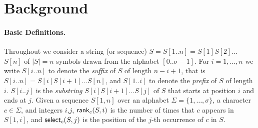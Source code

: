 \section{Background}
\label{sec-background}


\paragraph{Basic Definitions.}
Throughout we consider a string (or sequence) $S = S[1..n] = S[1]S[2]\ldots$ $S[n]$ of $|S| = n$ 
symbols drawn from the alphabet $[0..\sigma-1]$.
For $i=1,\ldots,n$ we
write $S[i..n]$ to denote the {\em suffix} of $S$ of length $n-i+1$,
that is $S[i..n] = S[i]S[i+1]\ldots S[n]$, and  
$S[1..i]$ to denote the {\em prefix} of $S$ of length $i$.
$S[i..j]$ is the {\em substring} $S[i]S[i+1]\ldots S[j]$ of $S$
that starts at position $i$ and ends at $j$. 
Given a sequence $S[1,n]$ over an alphabet $\Sigma =
\{1,\ldots,\sigma\}$, a character $c \in \Sigma $, and integers
$i$,$j$, $\textsf{rank}_c(S,i)$ is the number of times that $c$ appears in
$S[1,i]$, and $\textsf{select}_c(S,j)$ is the position of the $j$-th
occurrence of $c$ in $S$.


